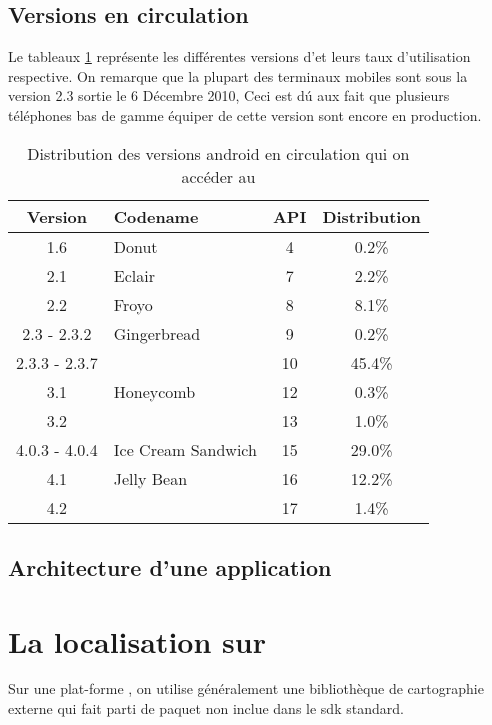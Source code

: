 \subsection{Versions \android en circulation}
Le tableaux \ref{tab:androidversion} représente les différentes versions d'\android et leurs taux d'utilisation respective. On remarque que la plupart des terminaux mobiles \android sont sous la version 2.3  sortie le 6 Décembre 2010, Ceci est dú aux fait que plusieurs téléphones bas de gamme équiper de cette version sont encore en production.

\begin{table}
\centering
\begin{tabular}{|c|l|c|c|}
\hline
\textbf{Version} & \textbf{Codename} & \textbf{API} & \textbf{Distribution}\\
\hline
1.6 & Donut & 4 & 0.2\%\\
\hline
2.1 & Eclair & 7 & 2.2\%\\
\hline
2.2 & Froyo & 8 & 8.1\%\\
\hline
2.3 - 2.3.2 & Gingerbread & 9 & 0.2\% \\
\cline{1-1}\cline{3-4}
2.3.3 - 2.3.7 & & 10 & 45.4\%\\
\hline
3.1 & Honeycomb & 12 & 0.3\%\\
\cline{1-1}\cline{3-4}
3.2 & & 13 & 1.0\%\\
\hline
4.0.3 - 4.0.4 & Ice Cream Sandwich & 15 & 29.0\%\\
\hline
4.1 & Jelly Bean & 16 & 12.2\%\\
\cline{1-1}\cline{3-4}
4.2 & & 17 & 1.4\%\\
\hline
\end{tabular}
\caption{Distribution des versions android en circulation qui on accéder au \protect\footnotemark[5]}
\label{tab:androidversion}
\end{table}

\subsection{Architecture d'une application \android}

\section{La localisation sur \android}%
Sur une plat-forme \android, on utilise généralement une bibliothèque de cartographie externe  qui fait parti de paquet  non inclue dans le \gls{sdk} standard.

